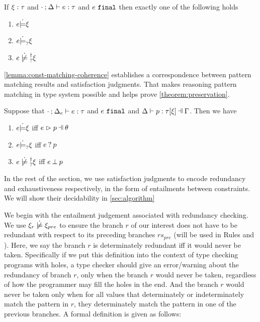



\begin{theorem}
  \label{theorem:exclusive-constraint-satisfaction}
  If $\xi : \tau$ and $\cdot \mathbin{;} \Delta \vdash e : \tau$ and $e ~\mathtt{final}$ then exactly one of the following holds
  \begin{enumerate}
  \item $e \dot{\models} \xi$
  \item $e \dot{\models}_{?} \xi$
  \item $\cnotsatisfyormay{e}{\xi}$
  \end{enumerate}
\end{theorem}

\autoref{lemma:const-matching-coherence} establishes a correspondence
between pattern matching results and satisfaction judgments. That makes
reasoning pattern matching in type system possible and helps prove
\autoref{theorem:preservation}.

\begin{lemma}
  \label{lemma:const-matching-coherence}
  Suppose that $\cdot \mathbin{;} \Delta_e \vdash e : \tau$ and $e ~\mathtt{final}$ and $\chpattyp{p}{\tau}{\xi}{\Gamma}{\Delta}$. Then we have
  \begin{enumerate}
  \item $e \dot{\models} \xi$ iff $\hpatmatch{e}{p}{\theta}$
  \item $e \dot{\models}_{?} \xi$ iff $e \mathbin{?} p$
  \item $\cnotsatisfyormay{e}{\xi}$ iff $e \mathbin{\bot} p$
  \end{enumerate}
\end{lemma}

In the rest of the section, we use satisfaction judgments to encode redundancy and exhaustiveness respectively, in the form of entailments between constraints. We will show their decidability in \autoref{sec:algorithm}

We begin with the entailment judgement associated with redundancy checking. We use $\cnotsatisfy{\xi_r}{\xi_{pre}}$ to ensure the branch $r$ of our interest does not have to be redundant with respect to its preceding branches $rs_{pre}$ (will be used in Rules \TOneRules and \TRules).
Here, we say the branch $r$ is determinately redundant iff it would never be taken. 
Specifically if we put this definition into the context of type checking programs with holes,
a type checker should give an error/warning about the redundancy of branch $r$,
only when the branch $r$ would never be taken, regardless of how the programmer may fill the holes in the end.
And the branch $r$ would never be taken only when for all values that determinately or indeterminately match the pattern in $r$, they determinately match the pattern in one of the previous branches.
A formal definition is given as follows:

